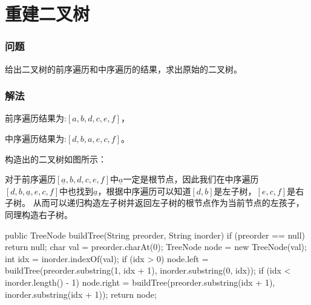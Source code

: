 \section{重建二叉树} %
\label{sec:construct-binary-tree}


\subsubsection{问题}
给出二叉树的前序遍历和中序遍历的结果，求出原始的二叉树。

\subsubsection{解法}
前序遍历结果为:$[a,b,d,c,e,f]$，

中序遍历结果为:$[d,b,a,e,c,f]$。

构造出的二叉树如图所示：

\begin{center}
	\Large
	\label{fig:construct-binary-tree-1}
\end{center}

对于前序遍历$[\underline{a},b,d,c,e,f]$中$\underline{a}$一定是根节点，因此我们在中序遍历$[d,b,\underline{a},e,c,f]$中也找到$\underline{a}$，根据中序遍历可以知道$[d,b]$是左子树，$[e,c,f]$是右子树。
从而可以递归构造左子树并返回左子树的根节点作为当前节点的左孩子，同理构造右子树。

\begin{Codex}[label={[$O(N)+O(1)$]Chap03_09_ConstructBinaryTree.java}]
public TreeNode buildTree(String preorder, String inorder) {
	if (preorder == null) {
		return null;
	}
	char val = preorder.charAt(0);
	TreeNode node = new TreeNode(val);
	int idx = inorder.indexOf(val);
	if (idx > 0) {
		node.left = buildTree(preorder.substring(1, idx + 1), inorder.substring(0, idx));
	}
	if (idx < inorder.length() - 1) {
		node.right = buildTree(preorder.substring(idx + 1), inorder.substring(idx + 1));
	}
	return node;
}
\end{Codex}


